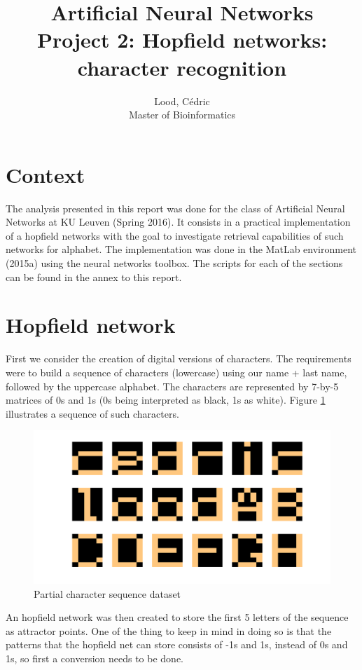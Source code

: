 \documentclass[11pt, a4paper]{article}
\title{ \huge Artificial Neural Networks \\ 
  { \large Project 2: Hopfield networks: character recognition}}
\author{
        Lood, Cédric \\
        \small Master of Bioinformatics
}
\begin{document}
\maketitle

\section{Context}
The analysis presented in this report was done for the class of
Artificial Neural Networks at KU Leuven (Spring 2016). It consists in
a practical implementation of a hopfield networks with the goal to
investigate retrieval capabilities of such networks for alphabet. The
implementation was done in the MatLab environment (2015a) using the
neural networks toolbox. The scripts for each of the sections can be
found in the annex to this report.

\section{Hopfield network}

First we consider the creation of digital versions of characters. The
requirements were to build a sequence of characters (lowercase) using
our name + last name, followed by the uppercase alphabet. The
characters are represented by 7-by-5 matrices of 0s and 1s (0s being
interpreted as black, 1s as white). Figure \ref{fig:hopfield_chargen}
illustrates a sequence of such characters.

\begin{figure}[H]
  \centering
  \includegraphics[scale=.30]{hopfield_chargen.png}
  \caption{Partial character sequence dataset}
  \label{fig:hopfield_chargen}
\end{figure}

An hopfield network was then created to store the first 5 letters of
the sequence as attractor points. One of the thing to keep in mind in
doing so is that the patterns that the hopfield net can store consists
of -1s and 1s, instead of 0s and 1s, so first a conversion needs to be
done. 
\end{document}
